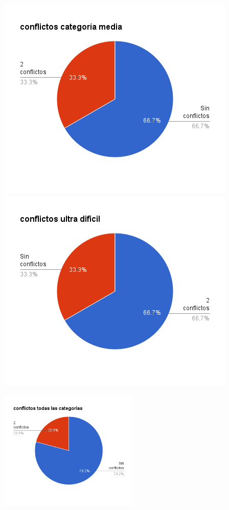 \documentclass[a4paper,spanish]{article}
\begin{document}
\begin{minipage}{0.50\textwidth}
	\includegraphics[width=\textwidth]{./graficos/conflictosMedia.png}
	\includegraphics[width=\textwidth]{./graficos/conflictosUltraDificil.png}

\end{minipage}

\begin{center}
	\includegraphics[width=0.5\textwidth]{./graficos/conflictosTodas.png}
\end{center}
\end{document}
